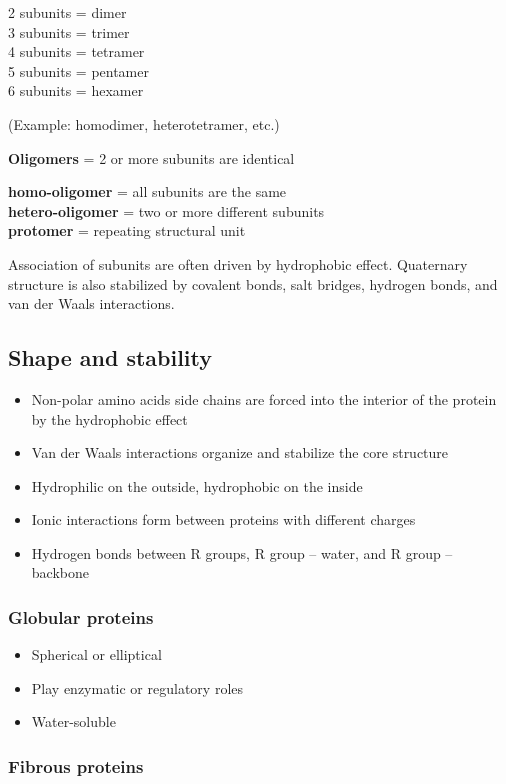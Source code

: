 \documentclass[letterpaper, 12pt]{article}
\begin{document}
2 subunits = dimer \\
3 subunits = trimer \\
4 subunits = tetramer \\
5 subunits = pentamer \\
6 subunits = hexamer

(Example: homodimer, heterotetramer, etc.)

\textbf{Oligomers} = 2 or more subunits are identical

\textbf{homo-oligomer} = all subunits are the same \\
\textbf{hetero-oligomer} = two or more different subunits \\
\textbf{protomer} = repeating structural unit

Association of subunits are often driven by hydrophobic effect. Quaternary structure is also stabilized by covalent bonds, salt bridges, hydrogen bonds, and van der Waals interactions.

\subsection*{Shape and stability}

\begin{itemize}
\item Non-polar amino acids side chains are forced into the interior of the protein by the hydrophobic effect
\item Van der Waals interactions organize and stabilize the core structure
\item Hydrophilic on the outside, hydrophobic on the inside
\item Ionic interactions form between proteins with different charges
\item Hydrogen bonds between R groups, R group -- water, and R group -- backbone
\end{itemize}

\subsubsection*{Globular proteins}

\begin{itemize}
\item Spherical or elliptical
\item Play enzymatic or regulatory roles
\item Water-soluble
\end{itemize}

\subsubsection*{Fibrous proteins}
\end{document}
